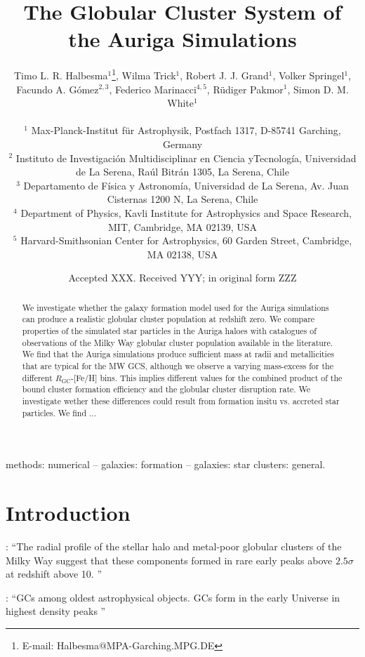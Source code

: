 \documentclass[a4paper,fleqn,usenatbib]{mnras}
\title[Auriga GCS]{The Globular Cluster System of the Auriga Simulations}
\author[T. L. R. Halbesma et al.]{\parbox[t]{\textwidth}{
    Timo L. R. Halbesma$^{1}$\thanks{E-mail: Halbesma@MPA-Garching.MPG.DE},
    Wilma Trick$^{1}$,
    Robert J. J. Grand$^{1}$, 
    Volker Springel$^{1}$, 
    Facundo A. G\'{o}mez$^{2,3}$, 
    Federico Marinacci$^{4,5}$,
    R\"{u}diger Pakmor$^{1}$, 
    Simon D. M. White$^{1}$
} \vspace{10pt} \\
$^{1}$ Max-Planck-Institut f\"ur Astrophysik, Postfach 1317, D-85741 Garching, Germany \\
$^{2}$ Instituto de Investigaci\'{o}n Multidisciplinar en Ciencia yTecnolog\'{i}a, Universidad de La Serena, Ra\'{u}l Bitr\'{a}n 1305, La Serena, Chile \\
$^{3}$ Departamento de F\'{i}sica y Astronom\'{i}a, Universidad de La Serena, Av. Juan Cisternas 1200 N, La Serena, Chile \\
$^{4}$ Department of Physics, Kavli Institute for Astrophysics and Space Research, MIT, Cambridge, MA 02139, USA \\
$^{5}$ Harvard-Smithsonian Center for Astrophysics, 60 Garden Street, Cambridge, MA 02138, USA \\
}
\date{Accepted XXX. Received YYY; in original form ZZZ}
\begin{document}
\label{firstpage}
\pagerange{\pageref{firstpage}--\pageref{lastpage}}
\maketitle

\begin{abstract}
We investigate whether the galaxy formation model used for the Auriga simulations 
can produce a realistic globular cluster population at redshift zero. We compare
properties of the simulated star particles in the Auriga haloes with
catalogues of observations of the Milky Way globular cluster population available
in the literature. We find that the Auriga simulations produce sufficient mass
at radii and metallicities that are typical for the MW GCS, although we observe
a varying mass-excess for the different $R_{\text{GC}}$-[Fe/H] bins. This implies
different values for the combined product of the bound cluster formation efficiency
and the globular cluster disruption rate. We investigate wether these differences
could result from formation insitu vs. accreted star particles. We find ...
\end{abstract}

\begin{keywords}
methods: numerical -- galaxies: formation -- galaxies: star clusters: general.
\end{keywords}



\section{Introduction}

\citet{2005MNRAS.364..367D}: ``The radial profile of the stellar halo and metal-poor globular
clusters of the Milky Way suggest that these components formed in rare early peaks above $2.5 \sigma$ at redshift above 10. ''

\citet{2017MNRAS.465.3622R}: ``GCs among oldest astrophysical objects. GCs form in the early Universe in highest density peaks \citep[e.g.][]{2005MNRAS.364..367D, 2009ApJ...706L.192B}''
\end{document}
